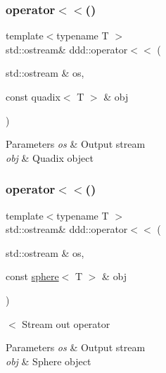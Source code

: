 \subsubsection{\texorpdfstring{operator$<$$<$()}{operator<<()}\hspace{0.1cm}{\footnotesize\ttfamily [9/10]}}
{\footnotesize\ttfamily template$<$typename T $>$ \\
std\+::ostream\& ddd\+::operator$<$$<$ (\begin{DoxyParamCaption}\item[{std\+::ostream \&}]{os,  }\item[{const quadix$<$ T $>$ \&}]{obj }\end{DoxyParamCaption})\hspace{0.3cm}{\ttfamily [inline]}}


\begin{DoxyParams}{Parameters}
{\em os} & Output stream \\
\hline
{\em obj} & Quadix object \\
\hline
\end{DoxyParams}
\mbox{\label{namespaceddd_a64dbb41c0ee377eb528907f3448514f6}} 
\subsubsection{\texorpdfstring{operator$<$$<$()}{operator<<()}\hspace{0.1cm}{\footnotesize\ttfamily [10/10]}}
{\footnotesize\ttfamily template$<$typename T $>$ \\
std\+::ostream\& ddd\+::operator$<$$<$ (\begin{DoxyParamCaption}\item[{std\+::ostream \&}]{os,  }\item[{const \hyperlink{classddd_1_1sphere}{sphere}$<$ T $>$ \&}]{obj }\end{DoxyParamCaption})\hspace{0.3cm}{\ttfamily [inline]}}



$<$ Stream out operator 


\begin{DoxyParams}{Parameters}
{\em os} & Output stream \\
\hline
{\em obj} & Sphere object \\
\hline
\end{DoxyParams}
\mbox{\label{namespaceddd_ad45c0a592c1aebe03fc48a0c57d52641}} 
